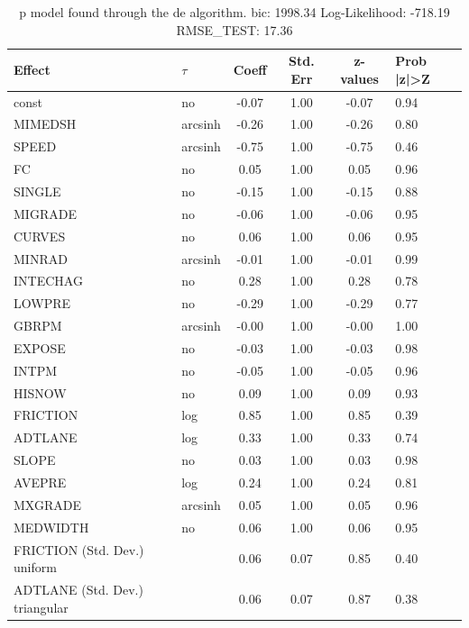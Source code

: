 \begin{table}
	\caption{p model found through the de algorithm. bic: 1998.34 Log-Likelihood: -718.19 RMSE_TEST: 17.36}
	\begin{center}
		\begin{tabular}{|l|l|c|c|c|l|}
			\hline
			Effect & $\tau$ & Coeff & Std. Err & z-values & Prob |z|>Z \\
			\hline
			const & no & -0.07 & 1.00 & -0.07 & 0.94 \\
			\hline
			MIMEDSH & arcsinh & -0.26 & 1.00 & -0.26 & 0.80 \\
			\hline
			SPEED & arcsinh & -0.75 & 1.00 & -0.75 & 0.46 \\
			\hline
			FC & no & 0.05 & 1.00 & 0.05 & 0.96 \\
			\hline
			SINGLE & no & -0.15 & 1.00 & -0.15 & 0.88 \\
			\hline
			MIGRADE & no & -0.06 & 1.00 & -0.06 & 0.95 \\
			\hline
			CURVES & no & 0.06 & 1.00 & 0.06 & 0.95 \\
			\hline
			MINRAD & arcsinh & -0.01 & 1.00 & -0.01 & 0.99 \\
			\hline
			INTECHAG & no & 0.28 & 1.00 & 0.28 & 0.78 \\
			\hline
			LOWPRE & no & -0.29 & 1.00 & -0.29 & 0.77 \\
			\hline
			GBRPM & arcsinh & -0.00 & 1.00 & -0.00 & 1.00 \\
			\hline
			EXPOSE & no & -0.03 & 1.00 & -0.03 & 0.98 \\
			\hline
			INTPM & no & -0.05 & 1.00 & -0.05 & 0.96 \\
			\hline
			HISNOW & no & 0.09 & 1.00 & 0.09 & 0.93 \\
			\hline
			FRICTION & log & 0.85 & 1.00 & 0.85 & 0.39 \\
			\hline
			ADTLANE & log & 0.33 & 1.00 & 0.33 & 0.74 \\
			\hline
			SLOPE & no & 0.03 & 1.00 & 0.03 & 0.98 \\
			\hline
			AVEPRE & log & 0.24 & 1.00 & 0.24 & 0.81 \\
			\hline
			MXGRADE & arcsinh & 0.05 & 1.00 & 0.05 & 0.96 \\
			\hline
			MEDWIDTH & no & 0.06 & 1.00 & 0.06 & 0.95 \\
			\hline
			FRICTION (Std. Dev.) uniform &  & 0.06 & 0.07 & 0.85 & 0.40 \\
			\hline
			ADTLANE (Std. Dev.) triangular &  & 0.06 & 0.07 & 0.87 & 0.38 \\

\end{tabular}
\end{center}
\end{table}

